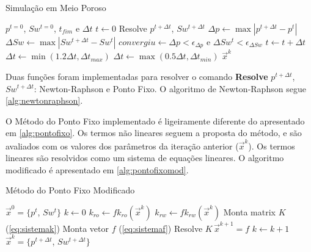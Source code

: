 \documentclass[final,5p]{elsarticle}
\numberwithin{equation}{section}
\begin{document}
        \begin{algorithm}
            \caption{Simulação em Meio Poroso}\label{alg:simulacao}
            \begin{algorithmic}
                \Require $p^{t=0}$, $Sw^{t=0}$, $t_{fim}$ e $\Delta t$
                \State $t \gets 0$
                \Repeat
                    \State Resolve $p^{t+\Delta t}$, $Sw^{t+\Delta t}$
                    \State $\Delta p \gets \max |p^{t+\Delta t} - p^t|$
                    \State $\Delta Sw \gets \max |Sw^{t+\Delta t} - Sw^t|$
                    \State $convergiu \gets \Delta p < \epsilon_{\Delta p}$ e $\Delta Sw^t < \epsilon_{\Delta Sw}$
                        \State $t \gets t + \Delta t$
                        \State $\Delta t \gets \min (1.2 \Delta t, \Delta t_{max})$
                    \Else
                        \State $\Delta t \gets \max (0.5 \Delta t, \Delta t_{min})$
                    \EndIf
                \State \Return $\vec{x}^{k}$
            \end{algorithmic}
        \end{algorithm}

        Duas funções foram implementadas para resolver o comando \textbf{Resolve} $p^{t+\Delta t}$, $Sw^{t+\Delta t}$: Newton-Raphson e Ponto Fixo. O algoritmo de Newton-Raphson segue \ref{alg:newtonraphson}.

        O Método do Ponto Fixo implementado é ligeiramente diferente do apresentado em \ref{alg:pontofixo}. Os termos não lineares seguem a proposta do método, e são avaliados com os valores dos parâmetros da iteração anterior ($\vec{x}^k$). Os termos lineares são resolvidos como um sistema de equações lineares. O algoritmo modificado é apresentado em \ref{alg:pontofixomod}.

        \begin{algorithm}
            \caption{Método do Ponto Fixo Modificado}\label{alg:pontofixomod}
            \begin{algorithmic}
                \Require $\vec{x}^0=\{p^{t}$, $Sw^{t}\}$
                \State $k \gets 0$
                \Repeat
                    \State $k_{ro} \gets fk_{ro}(\vec{x}^k)$
                    \State $k_{rw} \gets fk_{rw}(\vec{x}^k)$
                    \State Monta matrix $K$ (\ref{eq:sistemak})
                    \State Monta vetor $f$ (\ref{eq:sistemaf})
                    \State Resolve $K \, \vec{x}^{k+1} = f $
                    \State $k \gets k+1$
                \State \Return $\vec{x}^k=\{p^{t+\Delta t}$, $Sw^{t+\Delta t}\}$
            \end{algorithmic}
        \end{algorithm}
\end{document}
